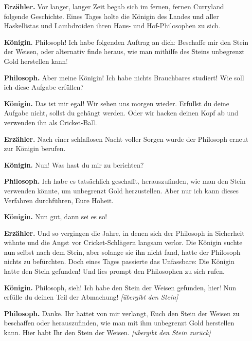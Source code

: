 \textbf{Erzähler.}
Vor langer, langer Zeit begab sich im fernen, fernen Curry\-land folgende
Geschichte. Eines Tages holte die Königin des Landes und aller Haskellistas und
Lambdroiden ihren Haus- und Hof-Phi\-lo\-so\-phen zu sich.

\textbf{Königin.}
Philosoph! Ich habe folgenden Auftrag an dich: Beschaffe mir den Stein der
Weisen, oder alternativ finde heraus, wie man mithilfe des Steins unbegrenzt
Gold herstellen kann!

\textbf{Philosoph.}
Aber meine Königin! Ich habe nichts Brauchbares studiert! Wie soll ich diese
Aufgabe erfüllen?

\textbf{Königin.}
Das ist mir egal! Wir sehen uns morgen wieder. Erfüllst du deine Aufgabe nicht,
sollst du gehängt werden. Oder wir hacken deinen Kopf ab und verwenden ihn als
Cricket-Ball.

\textbf{Erzähler.}
Nach einer schlaflosen Nacht voller Sorgen wurde der Philosoph erneut zur
Königin berufen.

\textbf{Königin.}
Nun! Was hast du mir zu berichten?

\textbf{Philosoph.}
Ich habe es tatsächlich geschafft, herauszufinden, wie man den Stein verwenden
könnte, um unbegrenzt Gold herzustellen. Aber nur ich kann dieses Verfahren
durchführen, Eure Hoheit.

\textbf{Königin.}
Nun gut, dann sei es so!

\textbf{Erzähler.}
Und so vergingen die Jahre, in denen sich der Philosoph in Sicherheit wähnte
und die Angst vor Cricket-Schlägern langsam verlor. Die Königin suchte nun
selbst nach dem Stein, aber solange sie ihn nicht fand, hatte der Philosoph
nichts zu befürchten. Doch eines Tages passierte das Unfassbare: Die Königin hatte den Stein
gefunden! Und lies prompt den Philosophen zu sich rufen.

\textbf{Königin.}
Philosoph, sieh! Ich habe den Stein der Weisen gefunden, hier! Nun erfülle du
deinen Teil der Abmachung! \emph{[übergibt den Stein]}

\textbf{Philosoph.}
Danke. Ihr hattet von mir verlangt, Euch den Stein der Weisen zu beschaffen
oder herauszufinden, wie man mit ihm unbegrenzt Gold herstellen kann. Hier habt
Ihr den Stein der Weisen. \emph{[übergibt den Stein zurück]}
